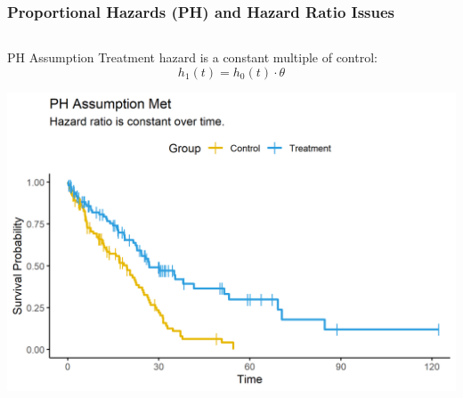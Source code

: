 \documentclass{beamer}
\begin{document}
\begin{frame}
\frametitle{Proportional Hazards (PH) and Hazard Ratio Issues}

\begin{columns}[T,onlytextwidth]
  \begin{column}{0.48\textwidth}
    \begin{block}{PH Assumption}
      Treatment hazard is a constant multiple of control:
      \[
        h_1(t) = h_0(t)\cdot \theta
      \]
    \end{block}

    \centering
    \includegraphics[width=\linewidth,height = 0.9\linewidth]{images/ph_assumption_met.png} \\
  \end{column}

  \hspace{0.04\textwidth}


\end{columns}
\end{frame}
\end{document}
